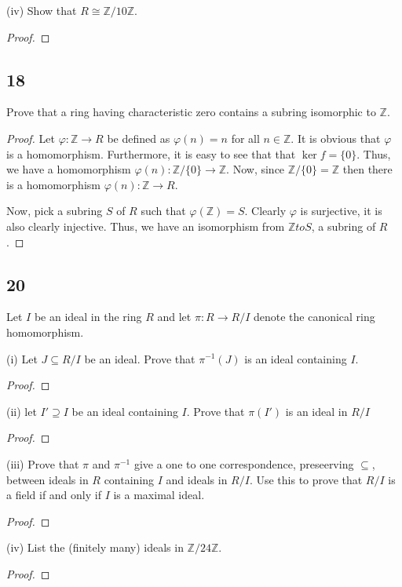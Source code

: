 \documentclass{article}
\newcommand{\Z}{\mathbb{Z}}
\newcommand{\ZmodnZ}[1]{\Z / #1 \Z}
\newenvironment{hwproof}[1]
{
    #1
    \begin{proof}
}{
    \end{proof}
}
\begin{document}
\begin{hwproof}
    {
        (iv) Show that $R \cong \ZmodnZ{10}$.
    }
\end{hwproof}

\subsection*{18}
\begin{hwproof}
    {
        Prove that a ring having characteristic zero contains a subring
        isomorphic to $\Z$.
    }
    Let $\varphi : \Z \to R$ be defined as $\varphi(n) = n$ for all $n \in \Z$.
    It is obvious that $\varphi$ is a homomorphism. Furthermore,
    it is easy to see that that $\ker f = \{0\}$. Thus, we have a homomorphism
    $\varphi(n): \Z / \{0\} \to \Z$. Now, since $\Z / \{0\} = \Z$ then there is
    a homomorphism $\varphi(n): \Z \to R$.

    Now, pick a subring $S$ of $R$ such that $\varphi(\Z) = S$. Clearly $\varphi$
    is surjective, it is also clearly injective. Thus, we have an isomorphism
    from $\Z to S$, a subring of $R$.
\end{hwproof}

\subsection*{20}
\begin{hwproof}
    {
        Let $I$ be an ideal in the ring $R$ and let $\pi : R \to R / I$ denote the
        canonical ring homomorphism.

        (i) Let $J \subseteq R / I$ be an ideal. Prove that $\pi^{-1}(J)$ is an
        ideal containing $I$.
    }
\end{hwproof}

\begin{hwproof}
    {
        (ii) let $I' \supseteq I$ be an ideal containing $I$. Prove that $\pi(I')$
        is an ideal in $R / I$
    }
\end{hwproof}

\begin{hwproof}
    {
        (iii) Prove that $\pi$ and $\pi^{-1}$ give a one to one correspondence,
        preseerving $\subseteq$, between ideals in $R$ containing $I$ and ideals
        in $R / I$. Use this to prove that $R / I$ is a field if and only if
        $I$ is a maximal ideal.
    }
\end{hwproof}

\begin{hwproof}
    {
        (iv) List the (finitely many) ideals in $\ZmodnZ{24}$.
    }
\end{hwproof}
\end{document}
